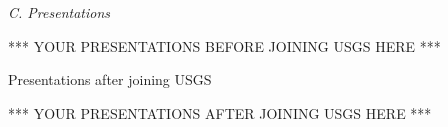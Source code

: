\documentclass[12pt]{article}
\makeatletter
\def\namedlabel#1#2{\begingroup
	\def\@currentlabel{#2}%
	\label{#1}\endgroup
}
\makeatother
\begin{document}
\begin{comment}

PRESENTATIONS BEFORE JOINING USGS

Optional LaTeX code-- As in the list of projects, you can make a description list for presentations and label each item so you can reference it in the text. In this example, we have given "C1." a named label "catspres". Then, you can reference it in the text, like "Over 50 people attended my presentation on cats (\ref{catspres"})."

Try the following:

Over 50 people attended my presentation on cats (\ref{catspres}).

\begin{description}
	\item[C1.\namedlabel{catspres}{C1}] Student Author*, Me, Other Authors, Date, Presentation Title, Venue. INVITED
	\item[C2.\namedlabel{pres20}{C2}] Student Author*, Me, Other Authors, Date, Presentation Title, Venue. INVITED
	\item[C3.\namedlabel{pres21}{C3}] Student Author*, Me, Other Authors, Date, Presentation Title, Venue. INVITED
\end{description}

\end{comment}

\vspace{10pt}
\raggedright \large \textit{C. Presentations} \\
\normalsize
\vspace{10pt}





*** YOUR PRESENTATIONS BEFORE JOINING USGS HERE ***





\centering Presentations after joining USGS \\
\vspace{-10pt}
\hrulefill
\raggedright
\vspace{10pt}





*** YOUR PRESENTATIONS AFTER JOINING USGS HERE ***
\end{document}
